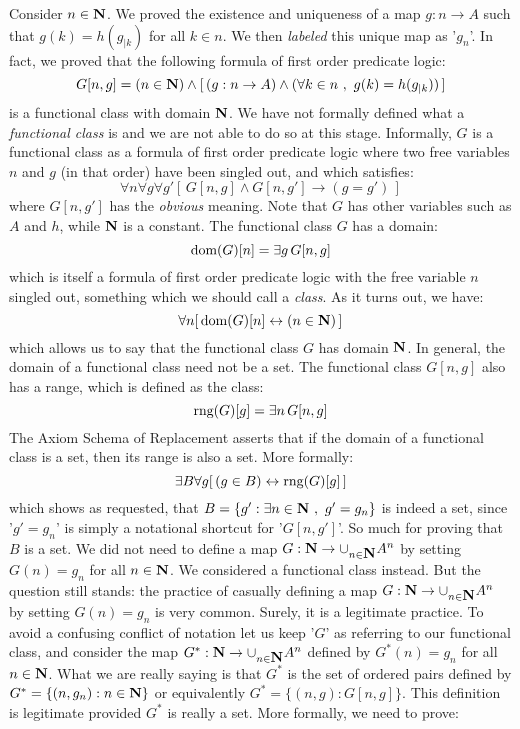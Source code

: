 Consider $n\in\mbox{$\bf N$}$. We proved the existence and uniqueness of a map
$g:n\to A$ such that $g(k)=h(g_{|k})$ for all $k\in n$. We then {\em
labeled} this unique map as '$g_{n}$'. In fact, we proved that the
following formula of first order predicate logic:
    \[
    G[n,g]=(n\in\mbox{$\bf N$})\land[\,(g:n\to A)\land(\forall k\in n\ ,\ g(k)=h(g_{|k}))\,]
    \]
is a functional class with domain $\mbox{$\bf N$}$. We have not formally defined
what a {\em functional class} is and we are not able to do so at
this stage. Informally, $G$ is a functional class as a formula of
first order predicate logic where two free variables $n$ and $g$ (in
that order) have been singled out, and which satisfies:
    \[
    \forall n\forall g\forall g'[\,G[n,g]\land G[n,g']\to (g=g')\,]
    \]
where $G[n,g']$ has the {\em obvious} meaning. Note that $G$ has
other variables such as $A$ and $h$, while $\mbox{$\bf N$}$ is a constant. The
functional class $G$ has a domain:
    \[
    \mbox{\rm dom}(G)[n]=\exists g\, G[n,g]
    \]
which is itself a formula of first order predicate logic with the
free variable $n$ singled out, something which we should call a {\em
class}. As it turns out, we have:
    \[
    \forall n[\, \mbox{\rm dom}(G)[n]\leftrightarrow (n\in\mbox{$\bf N$})\,]
    \]
which allows us to say that the functional class $G$ has domain
$\mbox{$\bf N$}$. In general, the domain of a functional class need not be a
set. The functional class $G[n,g]$ also has a range, which is
defined as the class:
    \[
    \mbox{\rm rng}(G)[g]=\exists n\, G[n,g]
    \]
The Axiom Schema of Replacement asserts that if the domain of a
functional class is a set, then its range is also a set. More
formally:
    \[
    \exists B\forall g[\,(g\in B)\leftrightarrow \mbox{\rm rng}(G)[g]\,]
    \]
which shows as requested, that $B=\{g':\exists n\in\mbox{$\bf N$}\ ,\
g'=g_{n}\}$ is indeed a set, since '$g'=g_{n}$' is simply a
notational shortcut for '$G[n,g']$'. So much for proving that $B$ is
a set. We did not need to define a map $G:\mbox{$\bf N$}\to\cup_{n\in\mbox{$\bf N$}}A^{n}$
by setting $G(n)=g_{n}$ for all $n\in\mbox{$\bf N$}$. We considered a functional
class instead. But the question still stands: the practice of
casually defining a map $G:\mbox{$\bf N$}\to\cup_{n\in\mbox{$\bf N$}}A^{n}$ by setting
$G(n)=g_{n}$ is very common. Surely, it is a legitimate practice. To
avoid a confusing conflict of notation let us keep '$G$' as
referring to our functional class, and consider the map
$G^{*}:\mbox{$\bf N$}\to\cup_{n\in\mbox{$\bf N$}}A^{n}$ defined by $G^{*}(n)=g_{n}$ for all
$n\in\mbox{$\bf N$}$. What we are really saying is that $G^{*}$ is the set of
ordered pairs defined by $G^{*}=\{(n,g_{n}): n\in\mbox{$\bf N$}\}$ or
equivalently $G^{*}=\{(n,g):G[n,g]\}$. This definition is legitimate
provided $G^{*}$ is really a set. More formally, we need to prove:
